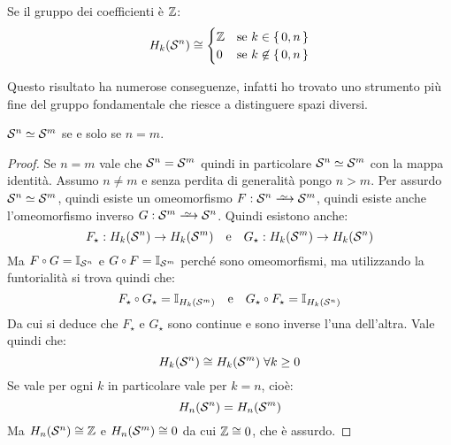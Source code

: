 
\begin{corollary}
  Se il gruppo dei coefficienti è $ \mathbb{Z} $:
  \[
    H_k(\mathcal{S}^{n}) \cong
    \begin{cases}
      \mathbb{Z} & \text{se } k \in \set{0, n} \\
      0 & \text{se } k \not \in \set{0, n}
    \end{cases}
  \]
\end{corollary}
Questo risultato ha numerose conseguenze, infatti ho trovato uno
strumento più fine del gruppo fondamentale che riesce a distinguere
spazi diversi.

\begin{corollary}
  $ \mathcal{S}^{n} \simeq \mathcal{S}^{m} $ se e solo se $ n = m $.
\end{corollary}
\begin{proof}
  Se $ n = m $ vale che $ \mathcal{S}^{n} = \mathcal{S}^{m} $ quindi in particolare
  $ \mathcal{S}^{n} \simeq \mathcal{S}^{m} $ con la mappa identità. Assumo $ n \not = m $ e senza
  perdita di generalità pongo $ n > m $. Per assurdo $ \mathcal{S}^{n} \simeq \mathcal{S}^{m} $,
  quindi esiste un omeomorfismo $ F: \Sph{n} \homoto \Sph{m} $, quindi esiste
  anche l'omeomorfismo inverso $ G: \Sph{m} \homoto \Sph{n} $. Quindi esistono
  anche:
  \[
    F_\star: H_k(\mathcal{S}^{n}) \to H_k(\mathcal{S}^{m}) \quad \text{e} \quad G_\star: H_k(\mathcal{S}^{m}) \to H_k(\mathcal{S}^{n})
  \]
  Ma $ F \circ G = \Id{\Sph{n}} $ e $ G \circ F = \Id{\Sph{m}} $ perché sono omeomorfismi,
  ma utilizzando la funtorialità si trova quindi che:
  \[
    F_\star \circ G_\star = \Id{H_k(\Sph{m})} \quad \text{e} \quad G_\star \circ F_\star = \Id{H_k(\Sph{n})}
  \]
  Da cui si deduce che $ F_\star $ e $ G_\star $ sono continue e sono inverse l'una
  dell'altra.
  Vale quindi che:
  \[
    H_k(\mathcal{S}^{n}) \cong H_k(\mathcal{S}^{m}) \; \forall k \geq 0
  \]
  Se vale per ogni $ k $ in particolare vale per $ k = n $, cioè:
  \[
    H_n(\mathcal{S}^{n}) = H_n(\mathcal{S}^{m})
  \]
  Ma $ H_n(\mathcal{S}^{n}) \cong \mathbb{Z} $ e $ H_n(\mathcal{S}^{m}) \cong 0 $ da cui $ \mathbb{Z} \cong 0 $, che è assurdo.
\end{proof}

